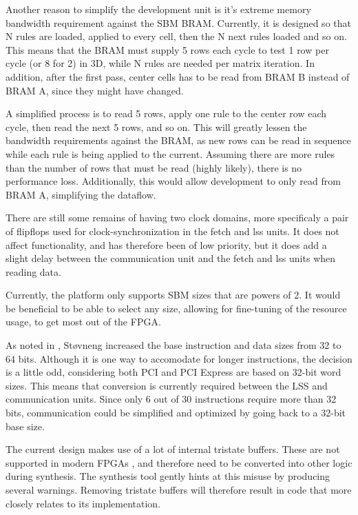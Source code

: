 Another reason to simplify the development unit is it's extreme memory bandwidth requirement against the SBM BRAM.
Currently, it is designed so that N rules are loaded, applied to every cell, then the N next rules loaded and so on.
This means that the BRAM must supply 5 rows each cycle to test 1 row per cycle (or 8 for 2) in 3D, while N rules are needed per matrix iteration.
In addition, after the first pass, center cells has to be read from BRAM B instead of BRAM A, since they might have changed.

A simplified process is to read 5 rows, apply one rule to the center row each cycle, then read the next 5 rows, and so on.
This will greatly lessen the bandwidth requirements against the BRAM, as new rows can be read in sequence while each rule is being applied to the current.
Assuming there are more rules than the number of rows that must be read (highly likely), there is no performance loss.
Additionally, this would allow development to only read from BRAM A, simplifying the dataflow.

There are still some remains of having two clock domains, more specificaly a pair of flipflops used for clock-synchronization in the fetch and lss units.
It does not affect functionality, and has therefore been of low priority, but it does add a slight delay between the communication unit and the fetch and lss units when reading data.

Currently, the platform only supports SBM sizes that are powers of 2.
It would be beneficial to be able to select any size, allowing for fine-tuning of the resource usage, to get most out of the FPGA.

As noted in \cite{stovneng2014sblock}, Støvneng increased the base instruction and data sizes from 32 to 64 bits.
Although it is one way to accomodate for longer instructions, the decision is a little odd, considering both PCI and PCI Express are based on 32-bit word sizes.
This means that conversion is currently required between the LSS and communication units.
Since only 6 out of 30 instructions require more than 32 bits, communication could be simplified and optimized by going back to a 32-bit base size.

The current design makes use of a lot of internal tristate buffers.
These are not supported in modern FPGAs \cite{koch2008buses}, and therefore need to be converted into other logic during synthesis.
The synthesis tool gently hints at this misuse by producing several warnings.
Removing tristate buffers will therefore result in code that more closely relates to its implementation.

